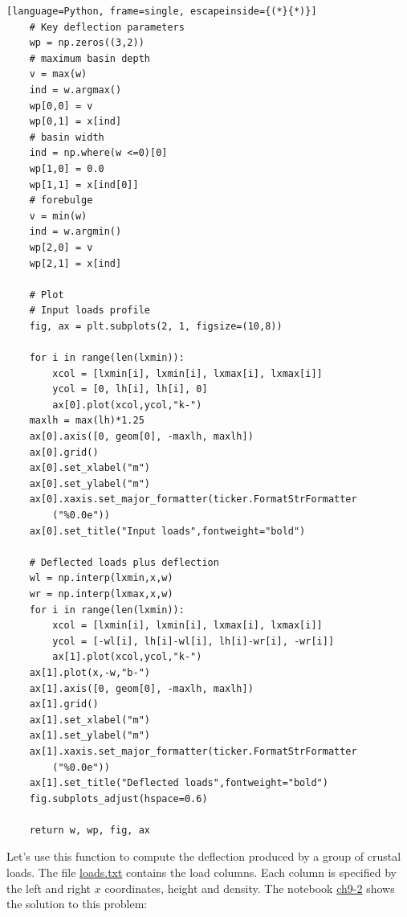 \documentclass[a4paper , 12pt]{book}
\begin{document}
\begin{center}
\begin{lstlisting}[language=Python, frame=single, escapeinside={(*}{*)}]
	# Key deflection parameters
	wp = np.zeros((3,2))
	# maximum basin depth
	v = max(w)
	ind = w.argmax()
	wp[0,0] = v
	wp[0,1] = x[ind]
	# basin width
	ind = np.where(w <=0)[0]
	wp[1,0] = 0.0
	wp[1,1] = x[ind[0]]
	# forebulge
	v = min(w)
	ind = w.argmin()
	wp[2,0] = v
	wp[2,1] = x[ind]
	
	# Plot
	# Input loads profile
	fig, ax = plt.subplots(2, 1, figsize=(10,8))	
	
	for i in range(len(lxmin)):
		xcol = [lxmin[i], lxmin[i], lxmax[i], lxmax[i]]
		ycol = [0, lh[i], lh[i], 0]
		ax[0].plot(xcol,ycol,"k-")
	maxlh = max(lh)*1.25
	ax[0].axis([0, geom[0], -maxlh, maxlh])
	ax[0].grid()
	ax[0].set_xlabel("m")
	ax[0].set_ylabel("m")
	ax[0].xaxis.set_major_formatter(ticker.FormatStrFormatter
		("%0.0e"))
	ax[0].set_title("Input loads",fontweight="bold")
	
	# Deflected loads plus deflection
	wl = np.interp(lxmin,x,w)
	wr = np.interp(lxmax,x,w)
	for i in range(len(lxmin)):
		xcol = [lxmin[i], lxmin[i], lxmax[i], lxmax[i]]
		ycol = [-wl[i], lh[i]-wl[i], lh[i]-wr[i], -wr[i]]
		ax[1].plot(xcol,ycol,"k-")
	ax[1].plot(x,-w,"b-")
	ax[1].axis([0, geom[0], -maxlh, maxlh])
	ax[1].grid()
	ax[1].set_xlabel("m")
	ax[1].set_ylabel("m")
	ax[1].xaxis.set_major_formatter(ticker.FormatStrFormatter
		("%0.0e"))
	ax[1].set_title("Deflected loads",fontweight="bold")
	fig.subplots_adjust(hspace=0.6)
	
	return w, wp, fig, ax
\end{lstlisting}
\end{center}

Let's use this function to compute the deflection produced by a group of crustal loads. The file \href{https://github.com/nfcd/compGeo/blob/master/source/data/ch9-2/loads.txt}{loads.txt} contains the load columns. Each column is specified by the left and right $x$ coordinates, height and density. The notebook \href{https://github.com/nfcd/compGeo/blob/master/source/notebooks/ch9-2.ipynb}{ch9-2} shows the solution to this problem:
\end{document}
